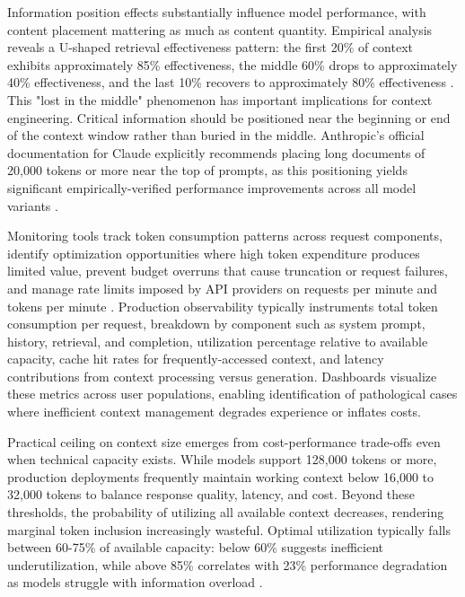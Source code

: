 Information position effects substantially influence model performance, with content placement mattering as much as content quantity. Empirical analysis reveals a U-shaped retrieval effectiveness pattern: the first 20\% of context exhibits approximately 85\% effectiveness, the middle 60\% drops to approximately 40\% effectiveness, and the last 10\% recovers to approximately 80\% effectiveness \citep{liu2024lost}. This "lost in the middle" phenomenon has important implications for context engineering. Critical information should be positioned near the beginning or end of the context window rather than buried in the middle. Anthropic's official documentation for Claude explicitly recommends placing long documents of 20,000 tokens or more near the top of prompts, as this positioning yields significant empirically-verified performance improvements across all model variants \citep{anthropic2024tips}.

Monitoring tools track token consumption patterns across request components, identify optimization opportunities where high token expenditure produces limited value, prevent budget overruns that cause truncation or request failures, and manage rate limits imposed by API providers on requests per minute and tokens per minute \citep{getmaxim2024context}. Production observability typically instruments total token consumption per request, breakdown by component such as system prompt, history, retrieval, and completion, utilization percentage relative to available capacity, cache hit rates for frequently-accessed context, and latency contributions from context processing versus generation. Dashboards visualize these metrics across user populations, enabling identification of pathological cases where inefficient context management degrades experience or inflates costs.

Practical ceiling on context size emerges from cost-performance trade-offs even when technical capacity exists. While models support 128,000 tokens or more, production deployments frequently maintain working context below 16,000 to 32,000 tokens to balance response quality, latency, and cost. Beyond these thresholds, the probability of utilizing all available context decreases, rendering marginal token inclusion increasingly wasteful. Optimal utilization typically falls between 60-75\% of available capacity: below 60\% suggests inefficient underutilization, while above 85\% correlates with 23\% performance degradation as models struggle with information overload \citep{anthropic2024budget}.

